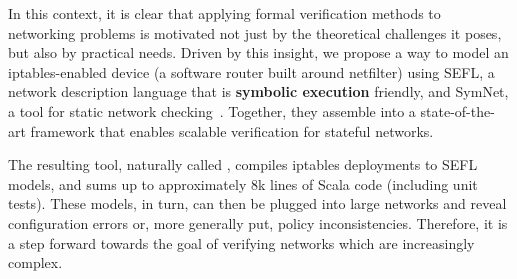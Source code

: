 In this context, it is clear that applying formal verification methods to
networking problems is motivated not just by the theoretical challenges it
poses, but also by practical needs.  Driven by this insight, we propose a way
to model an iptables-enabled device (a software router built around netfilter)
using SEFL, a network
description language that is \textbf{symbolic execution} friendly, and SymNet,
a tool for static network checking~\cite{stoenescu2016symnet,
stoenescu2013symnet}.  Together, they assemble into a state-of-the-art
framework that enables scalable verification for stateful networks.

The resulting tool, naturally called \TOOL, compiles iptables deployments to
SEFL models, and sums up to approximately 8k lines of Scala code (including
unit tests).  These models, in turn, can then be plugged into large networks
and reveal configuration errors or, more generally put, policy inconsistencies.
Therefore, it is a step forward towards the goal of verifying networks which
are increasingly complex.





